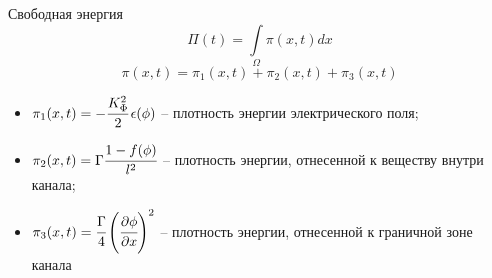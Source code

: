 \begin{frame}{Свободная энергия}
\vspace{-0.7cm}
$$\Pi(t) = \int\limits_\Omega \pi(x, t) dx$$
$$\pi(x, t) = \pi_1(x, t) + \pi_2(x, t) + \pi_3(x, t)$$
\vspace{-0.3cm}
\begin{itemize}
	\item $\pi_1(x, t) = -\cfrac{K_\Phi^2}{2} \, \epsilon(\phi)$ -- плотность энергии
	электрического поля;
	\item $\pi_2(x, t) = \Gamma \cfrac{1 - f(\phi)}{l^2}$ -- плотность энергии, отнесенной
	к веществу внутри канала;
	\item $\pi_3(x, t) = \cfrac{\Gamma}{4} \left( \cfrac{\partial \phi}{\partial x} \right)^2$ --
	плотность энергии, отнесенной к граничной зоне канала
\end{itemize}
\end{frame}


